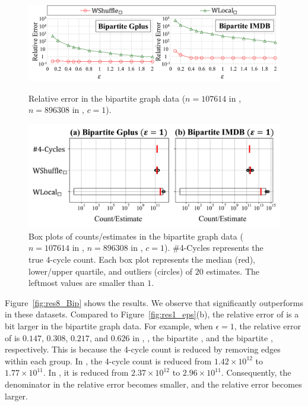 \begin{figure}[t]
  \centering
  \includegraphics[width=0.99\linewidth]{fig/res8_Bip.pdf}
  \vspace{-2mm}
  \caption{Relative error in the bipartite graph data
  ($n=107614$ in \Gplus{}, $n=896308$ in \IMDB{}, $c=1$).
  }
  \label{fig:res8_Bip}
\vspace{2mm}
  \centering
  \includegraphics[width=0.92\linewidth]{fig/res8_Bip_box.pdf}
  \vspace{-2mm}
  \caption{Box plots of counts/estimates in the bipartite graph data
  ($n=107614$ in \Gplus{}, $n=896308$ in \IMDB{}, $c=1$).
  \#4-Cycles represents the true 4-cycle count.
  Each box plot represents the median (red), lower/upper quartile, and outliers (circles) of $20$ estimates.
  The leftmost values are smaller than $1$.
  }
  \label{fig:res8_Bip_box}
\end{figure}

Figure~\ref{fig:res8_Bip} shows the results.
We observe that \AlgWSCyc{} significantly outperforms \AlgWLCyc{} in these datasets.
Compared to Figure~\ref{fig:res1_eps}(b), the relative error of \AlgWSCyc{} is a bit larger in the bipartite graph data.
For example, when $\epsilon=1$, the relative error of \AlgWSCyc{} is $0.147$, $0.308$, $0.217$, and $0.626$ in \Gplus{}, \IMDB{}, the bipartite \Gplus{}, and the bipartite \IMDB{}, respectively.
This is because the 4-cycle count is reduced by removing edges within each group.
In \Gplus{}, the 4-cycle count is reduced from $1.42 \times 10^{12}$ to $1.77 \times 10^{11}$.
In \IMDB{}, it is reduced from $2.37 \times 10^{12}$ to $2.96 \times 10^{11}$.
Consequently, the denominator in the relative error becomes smaller, and the relative error becomes larger.

